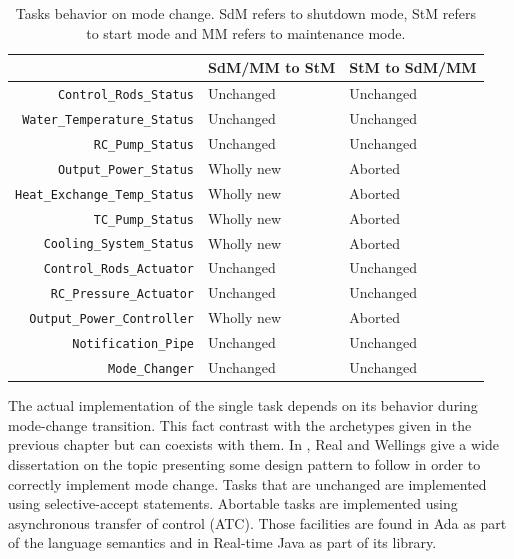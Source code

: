 \documentclass[10pt,a4paper]{report}
\begin{document}
\begin{table}[htb]
\centering
\begin{tabular}{|r | p{35mm} | p{35mm}|}
\hline
& \textbf{SdM/MM to StM} & \textbf{StM to SdM/MM} \\

\hline 
\texttt{\small Control\_Rods\_Status}      & Unchanged & Unchanged \\
\texttt{\small Water\_Temperature\_Status} & Unchanged & Unchanged \\
\texttt{\small RC\_Pump\_Status}           & Unchanged & Unchanged \\

\texttt{\small Output\_Power\_Status}        & Wholly new & Aborted \\
\texttt{\small Heat\_Exchange\_Temp\_Status} & Wholly new & Aborted \\
\texttt{\small TC\_Pump\_Status}             & Wholly new & Aborted \\
\texttt{\small Cooling\_System\_Status}      & Wholly new & Aborted \\

\texttt{\small Control\_Rods\_Actuator}   & Unchanged & Unchanged  \\
\texttt{\small RC\_Pressure\_Actuator}    & Unchanged & Unchanged  \\
\texttt{\small Output\_Power\_Controller} & Wholly new & Aborted   \\
\texttt{\small Notification\_Pipe}        & Unchanged & Unchanged \\
\texttt{\small Mode\_Changer}             & Unchanged & Unchanged \\

\hline
\end{tabular}
\caption{
    Tasks behavior on mode change. SdM refers to shutdown mode, StM refers
    to start mode and MM refers to maintenance mode.
}
\label{tbl:modechange}
\end{table}

The actual implementation of the single task depends on its behavior during 
mode-change transition. This fact contrast with the archetypes given in the
previous chapter but can coexists with them. In \cite{real99}, Real and Wellings 
give a wide dissertation on the topic presenting some design pattern to follow 
in order to correctly implement mode change. Tasks that are unchanged are 
implemented using selective-accept statements. Abortable tasks are implemented 
using asynchronous transfer of control (ATC). Those facilities are found in Ada 
as part of the language semantics and in Real-time Java as part of its library. 
\end{document}
